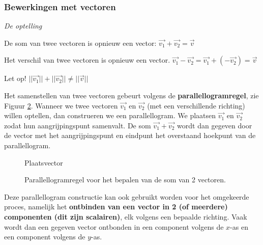 \subsubsection{Bewerkingen met vectoren}

\emph{De optelling}

\begin{definitie}
De som van twee vectoren is opnieuw een vector: $\vec{v_1}+\vec{v_2}=\vec{v}$

Het verschil van twee vectoren is opnieuw een vector. $\vec{v_1}-\vec{v_2}=\vec{v_1}+(-\vec{v_2})=\vec{v}$
\end{definitie}

\begin{opmerking}
	Let op! $||\vec{v_1}||+||\vec{v_2}|| \ne ||\vec{v}||$
\end{opmerking}

Het samenstellen van twee vectoren gebeurt volgens de \textbf{parallellogramregel}, zie Figuur \ref{fig:som_par}. Wanneer we twee vectoren $\vec{v_1}$ en $\vec{v_2}$ (met een verschillende richting) willen optellen, dan construeren we een parallellogram. We plaatsen $\vec{v_1}$ en $\vec{v_2}$ zodat hun aangrijpingspunt samenvalt. De som $\vec{v_1}+\vec{v_2}$ wordt dan gegeven door de vector met het aangrijpingspunt en eindpunt het overstaand hoekpunt van de parallellogram.




\begin{figure}
	\centering	
	
	\caption{Plaatsvector}
	\label{fig:plaatsvector}
\end{figure}




\begin{figure}
	\centering	

	\caption{Parallellogramregel voor het bepalen van de som van 2 vectoren.}
	\label{fig:som_par}
\end{figure}


 
 

Deze parallellogram constructie kan ook gebruikt worden voor het omgekeerde proces, namelijk het \textbf{ontbinden van een vector in 2 (of meerdere) componenten (dit zijn scalairen)}, elk volgens een bepaalde richting. Vaak wordt dan een gegeven vector ontbonden in een component volgens de $x$-as en een component volgens de $y$-as.



